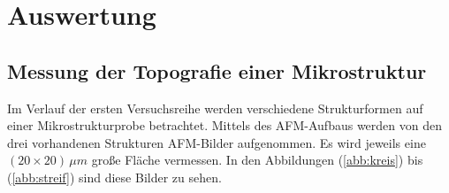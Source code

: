 \section{Auswertung}
\label{sec:Auswertung}

\subsection{Messung der Topografie einer Mikrostruktur}
Im Verlauf der ersten Versuchsreihe werden verschiedene Strukturformen auf einer Mikrostrukturprobe betrachtet.
Mittels des AFM-Aufbaus werden von den drei vorhandenen Strukturen AFM-Bilder aufgenommen.
Es wird jeweils eine $(20 \times 20) \, \mu m$ gro{\ss}e Fl\"ache vermessen.
In den Abbildungen (\ref{abb:kreis}) bis (\ref{abb:streif}) sind diese Bilder zu sehen.

